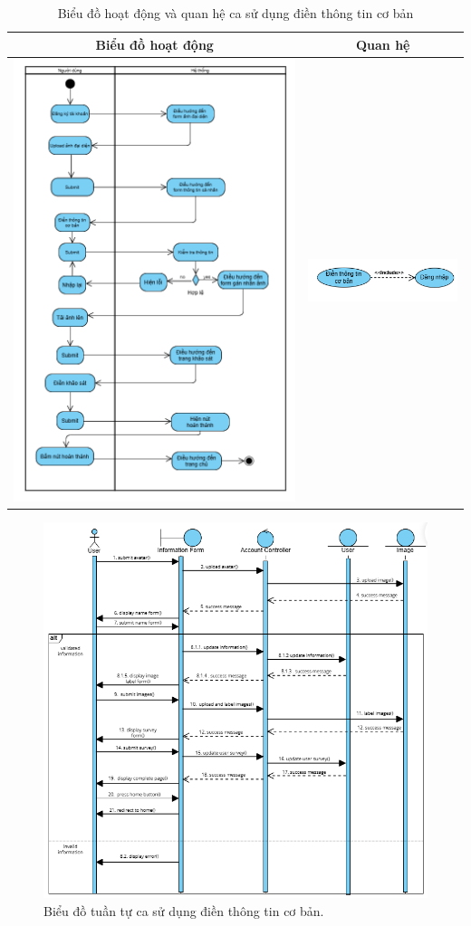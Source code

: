 \noindent
\begin{table}[H]
\centering
\caption{Biểu đồ hoạt động và quan hệ ca sử dụng điền thông tin cơ bản}
\label{tab:basic-info-usecase-activity}
\begin{tabular}{| c | c |}
    \hline
    \textbf{Biểu đồ hoạt động} & \textbf{Quan hệ} \\ 
    \hline
    \includegraphics[width=0.6\linewidth]{figures/c3/3-3-3-activity-diagram.png} 
    & 
    \includegraphics[width=0.35\linewidth]{figures/c3/3-3-3-relationship.png} \\ 
    \hline
\end{tabular}
\end{table}

\noindent
\begin{figure}[H]
    \centering  
    \includegraphics[width=1\textwidth]{figures/c3/3-3-3-sequence-diagram.png}
    \caption{Biểu đồ tuần tự ca sử dụng điền thông tin cơ bản.}
    \label{fig:3-3-3-sequence-diagram}
\end{figure}